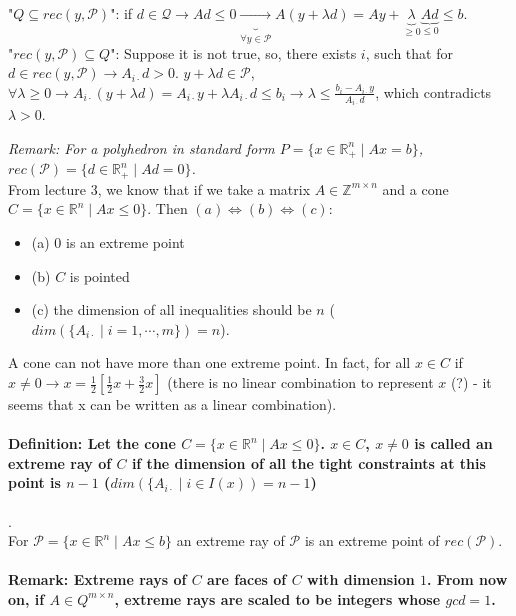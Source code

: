 \documentclass[main]{subfiles}
\begin{document}
"$Q \subseteq rec(y, \mathcal{P})$": if $d \in \mathcal{Q} \rightarrow Ad \leq
0 \underbrace{\rightarrow}_{\forall y \in \mathcal{P}} A (y + \lambda d) = Ay +
\underbrace{\lambda}_{\geq 0} \underbrace{A d}_{\leq 0} \leq b$. \\

"$rec(y, \mathcal{P}) \subseteq Q$": Suppose it is not true, so, there exists
$i$, such that for $d \in rec(y, \mathcal{P}) \rightarrow A_{i\cdot}d > 0$.
$y+ \lambda d \in \mathcal{P}$, $\forall \lambda \geq 0 \rightarrow A_{i\cdot}
(y + \lambda d) = A_{i\cdot}y + \lambda A_{i\cdot} d \leq b_i \rightarrow
\lambda \leq \frac{b_i - A_{i\cdot}y}{A_{i\cdot}d}$,
which contradicts $\lambda > 0$.


\emph{Remark: For a polyhedron in standard form $P=\{x \in \mathbb{R}^n_+ \mid
Ax = b \}$, $rec(\mathcal{P}) = \{d \in \mathbb{R}^n_+ \mid Ad = 0 \}$. }\\

From lecture 3, we know that if we take a matrix $A \in \mathbb{Z}^{m\times n}$
and a cone $C = \{x \in \mathbb{R}^n \mid Ax \leq 0 \}$. Then $(a) \iff (b)
\iff (c)$:
\begin{itemize}
\item (a) $0$ is an extreme point
\item (b) $C$ is pointed
\item (c) the dimension of all inequalities should be $n$ ($dim(\{A_{i\cdot} 
\mid i = 1, \cdots, m \}) = n$). 
\end{itemize}

A cone can not have more than one extreme point. In fact, for all $x \in C$ if
$x \neq 0 \rightarrow x = \frac{1}{2}[\frac{1}{2}x + \frac{3}{2}x]$ (there is
no linear combination to represent $x$ (?) - it seems that x can be written as
a linear combination).


\paragraph{Definition: Let the cone $C =\{x \in \mathbb{R}^n \mid Ax \leq 0\}$.
$x \in C$, $ x \neq 0$ is called an extreme ray of $C$ if the dimension of all
the tight constraints at this point is $n-1$ ($dim(\{A_{i\cdot} \mid i \in
I(x)) = n-1$)}.\\
For $\mathcal{P} = \{x \in \mathbb{R}^n \mid Ax \leq b \}$ an extreme ray of
$\mathcal{P}$ is an extreme point of $rec(\mathcal{P})$.

\paragraph{Remark: Extreme rays of $C$ are faces of $C$ with dimension $1$. 
From now on, if $A \in Q^{m \times n}$, extreme rays are scaled to be integers 
whose $gcd = 1$.}
\end{document}
